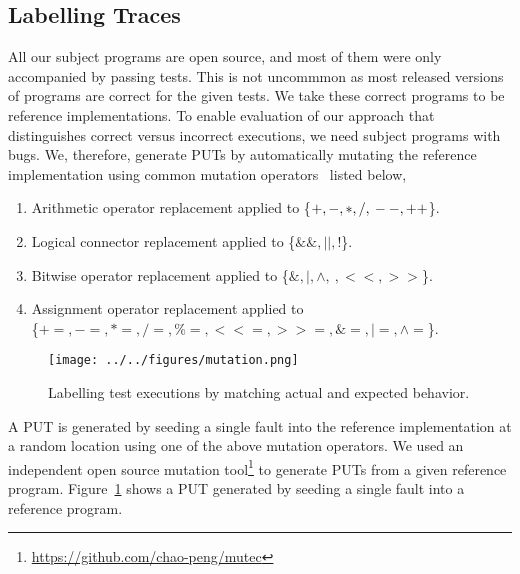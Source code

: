 \subsection{Labelling Traces}
\label{sec:labelling-traces}
All our subject programs are open source, and most of them were only accompanied by passing tests. This is not uncommmon as most released versions of programs are correct for the given tests. We take these correct programs to be reference implementations. To enable evaluation of our approach that distinguishes correct versus incorrect executions, we need subject programs with bugs. We, therefore, generate PUTs by automatically mutating the reference implementation using common mutation operators~\cite{jia2011analysis} listed below, 
\begin{enumerate}[itemsep = 0pt, topsep = 0pt, partopsep=0pt]
	\item {Arithmetic operator replacement applied to \{$+, -, *, /,\\ --, ++$\}.}
	\item {Logical connector replacement applied to \{$\&\&, ||, !$\}.}
	\item {Bitwise operator replacement applied to \{$\&, |, \wedge, ~, <<, >>$\}.}	\item {Assignment operator replacement applied to \\ \{$+=, -=, *=, /=, \%=, <<=, >>=, \&=, |=, \wedge=$\}.}
\end{enumerate}
\begin{figure}[ht!]
	\vspace{-12pt}	
	\centering
	\texttt{[image: ../../figures/mutation.png]}
	\caption{Labelling test executions by matching actual and expected behavior.}
	\label{fig:labelling}
	\vspace{-10pt}
\end{figure}
A PUT is generated by seeding a single fault into the reference implementation at a random location using one of the above mutation operators. 
We used an independent open source mutation tool\footnote{\url{https://github.com/chao-peng/mutec}} to generate PUTs from a given reference program. 
Figure~\ref{fig:labelling} shows a PUT generated by seeding a single fault into a reference program.
